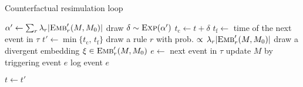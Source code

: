 \begin{algorithm}
\caption{Counterfactual resimulation loop}\label{alg:cosimulation}
\begin{spacing}{1.2}
\begin{algorithmic}
  \STATE 
  \STATE \COMMENT { $t$ is the current time, $M$ the current state mixture and
    $M_0$ the intermediate state of $\tau$ at time $t$ }
  \STATE
  \STATE $\alpha' \gets \sum_r {\lambda_r |{\textsc{Emb}}'_{r}(M, M_0)|}$
  \STATE draw $\delta \sim \textsc{Exp}(\alpha') $
  \STATE $t_{\text{c}} \gets t + \delta$
  \STATE $t_{\text{f}} \gets $ time of the next event in $\tau$
  \STATE $t' \gets \min \{ t_{\text{c}}, \, t_{\text{f}} \}$
      \STATE draw a rule $r$ with prob.
      $\propto \, \lambda_r |{\textsc{Emb}}'_{r}(M, M_0)|$
      \STATE  draw a divergent embedding $\xi \in {\textsc{Emb}}'_{r}(M, M_0)$
  \ELSE
      \STATE $e \gets $ next event in $\tau$
  \ENDIF
      \STATE update $M$ by triggering event $e$
      \STATE log event $e$
  \ENDIF

  \STATE $t \gets t'$
  \STATE
\end{algorithmic}
\end{spacing}
\end{algorithm}
